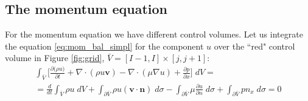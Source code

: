 \documentclass[12pt, a4paper]{article}
\begin{document}
\subsection{The momentum equation}
For the momentum equation we have different control volumes. Let us integrate 
the equation \eqref{eq:mom_bal_simpl} for the component $u$ over the ``red" 
control volume in Figure \ref{fig:grid}, $\bar{V} = [I-1,I] \times [j,j+1]$:
\begin{multline*}
\int_{\bar{V}} \bigg[ \frac{\partial{(\rho u})}{\partial t} + \nabla 
\cdot (\rho u \mathbf{v} ) - \nabla \cdot (\mu \nabla u) + 
\frac{\partial p}{\partial x} \bigg ]\; dV =\\
=\frac{d}{dt} \int_{\bar{V}} \rho u\; dV+ \int_{\partial \bar{V}} \rho u 
(\mathbf{v} \cdot 
\mathbf{n}) \; d\sigma - \int_{\partial \bar{V}} \mu \frac{\partial u}{\partial 
n} \; d\sigma + \int_{\partial \bar{V}} p n_x \; d\sigma = 0
\end{multline*}
\end{document}
